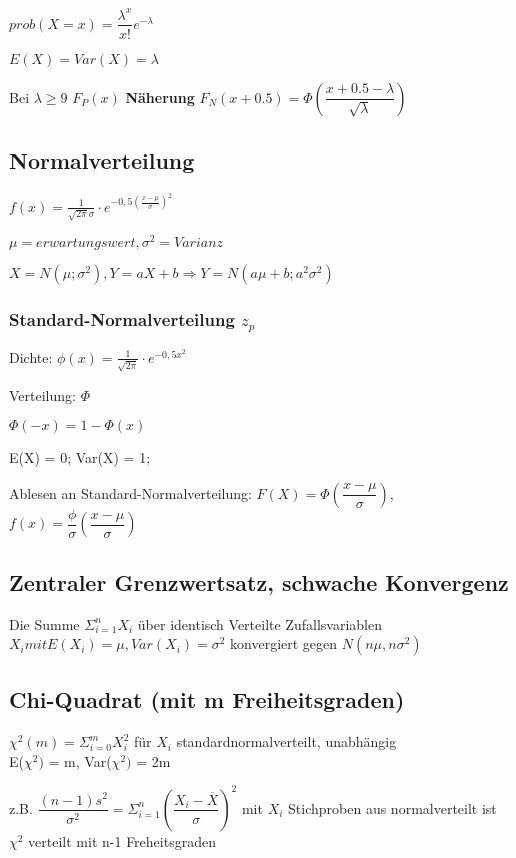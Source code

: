 $prob(X=x) = \dfrac{\lambda^x}{x!}e^{-\lambda}$

$E(X) = Var(X) = \lambda$

Bei $\lambda \geq 9$ $F_P(x) $ \textbf{Näherung} $ F_N(x+0.5)=\Phi \left( \dfrac{x+0.5-\lambda}{\sqrt{\lambda}}\right)$


\subsection*{Normalverteilung}
$f(x) = \frac{1}{\sqrt{2\pi}\sigma} \cdot e^{-0,5\left(\frac{x-\mu}{\sigma}\right)^2}$

$\mu = erwartungswert,\sigma^2 = Varianz$

$X = N(\mu;\sigma^2), Y = aX + b \Rightarrow Y = N(a\mu + b; a^2\sigma^2)$

\subsubsection*{Standard-Normalverteilung $z_p$}
Dichte: $\phi(x) = \frac{1}{\sqrt{2\pi}} \cdot e^{- 0,5 x^2}$

Verteilung: $\Phi$

$\Phi(-x) = 1-\Phi(x)$

E(X) = 0; Var(X) = 1;


Ablesen an Standard-Normalverteilung: $F(X) = \Phi \left(\dfrac{x-\mu}{\sigma} \right)$, $f(x) = \dfrac{\phi}{\sigma} \left(\dfrac{x-\mu}{\sigma} \right)$

\subsection*{Zentraler Grenzwertsatz, schwache Konvergenz}
Die Summe $\Sigma_{i=1}^nX_i$ über identisch Verteilte Zufallsvariablen $X_i mit E(X_i) = \mu, Var(X_i) = \sigma^2$ konvergiert gegen $N(n\mu,n\sigma^2)$






\subsection*{Chi-Quadrat (mit m Freiheitsgraden)}
$ \chi^2(m) = \Sigma_{i=0}^m X_i^2$ für $X_i$ standardnormalverteilt, unabhängig \\
E($\chi^2)$ = m, Var($\chi^2)$ = 2m

z.B. $\dfrac{(n-1)s^2}{\sigma^2} = \Sigma_{i=1}^n \left(\dfrac{X_i - \overline{X}}{\sigma}\right)^2$
mit $X_i$ Stichproben aus normalverteilt ist $\chi^2$ verteilt mit n-1 Freheitsgraden

